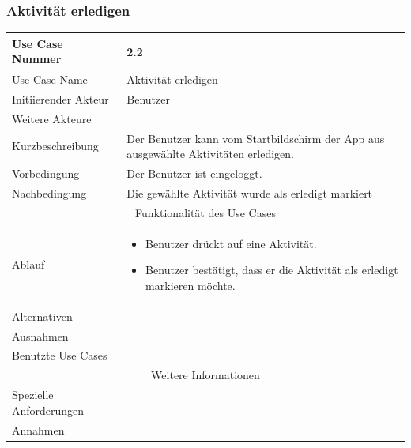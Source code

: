 \documentclass[10pt,a4paper]{article}
\begin{document}
\subsubsection{Aktivit\"at erledigen}
	\begin{tabularx}{\textwidth}{|l|X|}
	\hline Use Case Nummer & 2.2 \\ 
	\hline Use Case Name & Aktivit\"at erledigen \\ 
	\hline Initiierender Akteur & Benutzer \\
	\hline Weitere Akteure &  \\
	\hline Kurzbeschreibung & Der Benutzer kann vom Startbildschirm der App aus ausgew\"ahlte Aktivit\"aten erledigen. \\
	\hline Vorbedingung & Der Benutzer ist eingeloggt. \\
	\hline Nachbedingung & Die gewählte Aktivit\"at wurde als erledigt markiert \\
	\hline \multicolumn{2}{|c|}{Funktionalität des Use Cases}\\
	\hline Ablauf & \begin{itemize}
		\item Benutzer drückt auf eine Aktivit\"at.
		\item Benutzer best\"atigt, dass er die Aktivit\"at als erledigt markieren möchte.
	\end{itemize} \\
	\hline Alternativen &  \\
	\hline Ausnahmen &  \\
	\hline Benutzte Use Cases &  \\
	\hline \multicolumn{2}{|c|}{Weitere Informationen} \\
	\hline Spezielle Anforderungen &  \\
	\hline Annahmen &  \\
	\hline
	\end{tabularx}
\end{document}
